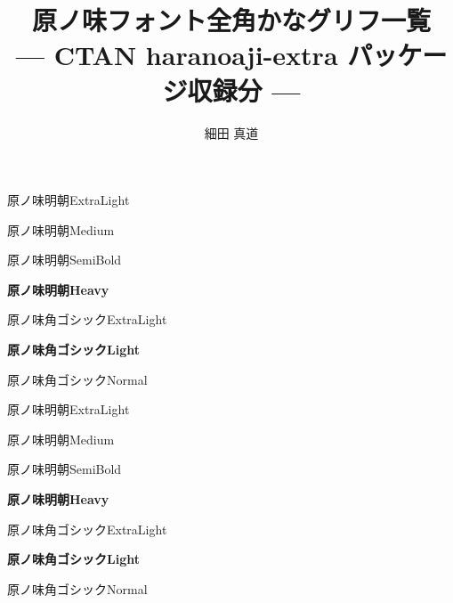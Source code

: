\documentclass[dvipdfmx]{jsarticle}
\title{原ノ味フォント全角かなグリフ一覧\\
--- CTAN haranoaji-extra パッケージ収録分 ---}
\author{細田 真道}
\begin{document}
\maketitle
{}

\clearpage
\parindent=0pt
\fboxsep=0pt

\mcfamily\ltseries
{\huge 原ノ味明朝\textmd{ExtraLight}}

\testAllH

\clearpage

\mcfamily\mdseries
{\huge 原ノ味明朝\textmd{Medium}}

\testAllH

\clearpage

\mgfamily %
{\huge 原ノ味明朝\textmd{SemiBold}}

\testAllH

\clearpage

\mcfamily\bfseries
{\huge 原ノ味明朝\textmd{Heavy}}

\testAllH

\clearpage

\gtfamily\mdseries
{\huge 原ノ味角ゴシック\textmd{ExtraLight}}

\testAllH

\clearpage

\gtfamily\bfseries
{\huge 原ノ味角ゴシック\textmd{Light}}

\testAllH

\clearpage

\gtfamily\ebseries
{\huge 原ノ味角ゴシック\textmd{Normal}}

\testAllH

\clearpage

\mcfamily\ltseries
{\huge 原ノ味明朝\textmd{ExtraLight}}

\testAllV

\clearpage

\mcfamily\mdseries
{\huge 原ノ味明朝\textmd{Medium}}

\testAllV

\clearpage

\mgfamily %
{\huge 原ノ味明朝\textmd{SemiBold}}

\testAllV

\clearpage

\mcfamily\bfseries
{\huge 原ノ味明朝\textmd{Heavy}}

\testAllV

\clearpage

\gtfamily\mdseries
{\huge 原ノ味角ゴシック\textmd{ExtraLight}}

\testAllV

\clearpage

\gtfamily\bfseries
{\huge 原ノ味角ゴシック\textmd{Light}}

\testAllV

\clearpage

\gtfamily\ebseries
{\huge 原ノ味角ゴシック\textmd{Normal}}

\testAllV
\end{document}
